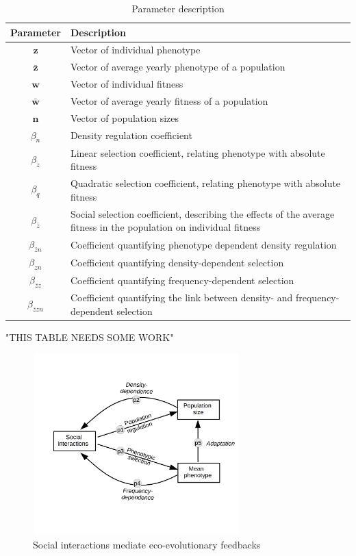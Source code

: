 \documentclass{article}
\begin{document}
\newpage
\begin{table}
	\begin{singlespace}
		\begin{tabular}{|c|p{12cm}|} 
			\hline
			
			Parameter & Description \\ 
			\hline
			$\mathbf{z}$        & Vector of individual phenotype \\ 
			$\bar{\mathbf{z}}$  & Vector of average yearly phenotype of a population\\ 
			$\mathbf{w}$        & Vector of individual fitness \\ 
			$\bar{\mathbf{w}}$  & Vector of average yearly fitness of a population\\ 
			$\mathbf{n}$        & Vector of population sizes \\ 
			$\beta_n$              & Density regulation coefficient \\ 
			$\beta_z$              & Linear selection coefficient, relating phenotype with absolute fitness \\ 
			$\beta_q$              & Quadratic selection coefficient, relating phenotype with absolute fitness \\ 
			$\beta_{\bar{z}}$      & Social selection coefficient, describing the effects of the average fitness in the population on individual fitness \\ 
			$\beta_{\bar{z}n}$     & Coefficient quantifying phenotype dependent density regulation \\ 
			$\beta_{zn}$           & Coefficient quantifying density-dependent selection \\ 
			$\beta_{\bar{z}z}$     & Coefficient quantifying frequency-dependent selection \\ 
			$\beta_{\bar{z}zn}$    & Coefficient quantifying the link between density- and frequency-dependent selection\\ 
			\hline
		\end{tabular}
		\caption{Parameter description  }
	\end{singlespace}
\end{table}

"THIS TABLE NEEDS SOME WORK"

  
\begin{figure}[ht]
	\centering
	\includegraphics[width=8cm, height=7cm]{Figures/Fig1.jpg}
	\caption{Social interactions mediate eco-evolutionary feedbacks}
\end{figure}
\end{document}
